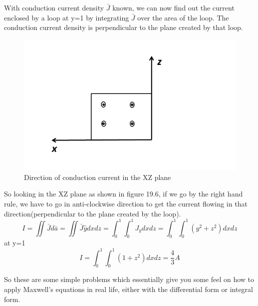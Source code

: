 \begin{exmp}
With conduction current density $\bar{J}$ known, we can now find out the current enclosed by a loop at y=1 by integrating $\bar{J}$ over the area of the loop. The conduction current density is perpendicular to the plane created by that loop.
\begin{figure}[h]
\centering
\includegraphics[width=1\linewidth]{./graphics/problemXZplane}
\caption{Direction of conduction current in the XZ plane}
\end{figure} 
So looking in the XZ plane as shown in figure 19.6, if we go by the right hand rule, we have to go in anti-clockwise direction to get the current flowing in that direction(perpendicular to the plane created by the loop).
\begin{dmath*}
I=\iint\bar{J}d\bar{a}=\iint\bar{J}\hat{y}dxdz
=\int_{0}^{1}\int_{0}^{1}J_{y}dxdz
=\int_{0}^{1}\int_{0}^{1}(y^{2}+z^{2})dxdz
\end{dmath*}
at y=1
\begin{dmath*}
I=\int_{0}^{1}\int_{0}^{1}(1+z^{2})dxdz
= \frac{4}{3}A
\end{dmath*}
\end{exmp}
So these are some simple problems which essentially give you some feel on how to apply Maxwell's equations in real life, either with the differential form or integral form.
